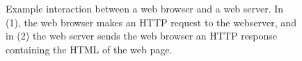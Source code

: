 \begin{figure}[tb]
  \centering
  \caption[Example interaction between a web browser and a web
    server.]{Example interaction between a web browser and a web
    server. In (1), the web browser makes an HTTP request to the
    webserver, and in (2) the web server sends the web browser an HTTP
    response containing the HTML of the web page.} 
\end{figure}
